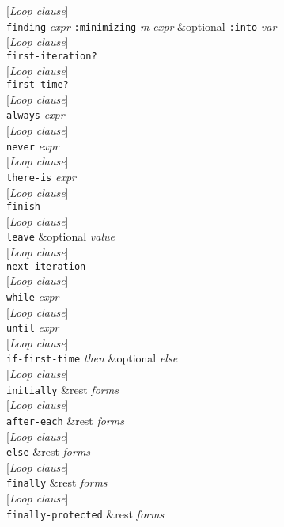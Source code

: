 \documentclass[10pt]{book}
\newenvironment{defother}[2]{[\textit{#1}]\\\texttt{#2}}{\\}
\begin{document}
\begin{defother}{Loop clause}{finding} \textit{expr} \texttt{:minimizing} \textit{m-expr} \&optional \texttt{:into} \textit{var}\end{defother}
\begin{defother}{Loop clause}{first-iteration?}\end{defother}
\begin{defother}{Loop clause}{first-time?}\end{defother}
\begin{defother}{Loop clause}{always} \textit{expr}\end{defother}
\begin{defother}{Loop clause}{never} \textit{expr}\end{defother}
\begin{defother}{Loop clause}{there-is} \textit{expr}\end{defother}
\begin{defother}{Loop clause}{finish}\end{defother}
\begin{defother}{Loop clause}{leave} \&optional \textit{value}\end{defother}
\begin{defother}{Loop clause}{next-iteration}\end{defother}
\begin{defother}{Loop clause}{while} \textit{expr}\end{defother}
\begin{defother}{Loop clause}{until} \textit{expr}\end{defother}
\begin{defother}{Loop clause}{if-first-time} \textit{then} \&optional \textit{else}\end{defother}
\begin{defother}{Loop clause}{initially} \&rest \textit{forms}\end{defother}
\begin{defother}{Loop clause}{after-each} \&rest \textit{forms}\end{defother}
\begin{defother}{Loop clause}{else} \&rest \textit{forms}\end{defother}
\begin{defother}{Loop clause}{finally} \&rest \textit{forms}\end{defother}
\begin{defother}{Loop clause}{finally-protected} \&rest \textit{forms}\end{defother}
\end{document}
